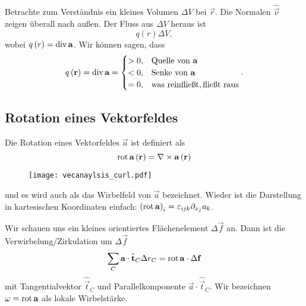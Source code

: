 Betrachte zum Verständnis ein kleines Volumen $\Delta  V$ bei $\vec {r}$. Die Normalen $\hat{\vec {\nu }}$ zeigen überall nach außen. Der Fluss aus $\Delta  V$ heraus ist
\begin{equation*}
	q\left(r\right)\Delta  V,
\end{equation*}
wobei $q\left(r\right)=\operatorname{div} \mathbf{a}$. Wir können sagen, dass
\begin{align*}
	q\left(\mathbf{r}\right)=\operatorname{div} \mathbf{a}=\begin{cases} >0, & \text{Quelle von }\mathbf{a}                     \\
              <0, & \text{Senke von }\mathbf{a}                      \\
              =0, & \text{was reinflie\ss t},\text{flie\ss t raus}
	                                      \end{cases} .
\end{align*}



\subsection{Rotation eines Vektorfeldes}

Die Rotation eines Vektorfeldes $\vec {a}$ ist definiert als
\begin{equation*}
	\operatorname{rot} \mathbf{a}\left(\mathbf{r}\right)=\nabla \times \mathbf{a}\left(\mathbf{r}\right)
\end{equation*}


\begin{figure}[htb]
	\centering
	\texttt{[image: vecanaylsis\_curl.pdf]}
	\caption{}
	\label{fig:vecanaylsis_curl}
\end{figure}

und es wird auch als das Wirbelfeld von $\vec {a}$ bezeichnet. Wieder ist die Darstellung in kartesischen Koordinaten einfach: $\left(\operatorname{rot} \mathbf{a}\right)_{i}=\varepsilon _{ijk}\partial _{{x_{j}}}a_{k}$.

Wir schauen uns ein kleines orientiertes Flächenelement $\Delta\vec f$ an. Dann ist die Verwirbelung/Zirkulation um $\Delta\vec  f$
\begin{equation*}
	\sum _{C}\mathbf{a}\cdot \hat{\mathbf{t}}_{C}\Delta  r_{C}=\operatorname{rot} \mathbf{a}\cdot \Delta \mathbf{f}
\end{equation*}
mit Tangentialvektor $\hat{\vec {t}}_{C}$ und Parallelkomponente $\vec {a}\cdot \hat{\vec {t}}_{C}$. Wir bezeichnen $\mathbf{\omega }=\operatorname{rot} \mathbf{a}$ als lokale Wirbelstärke.

